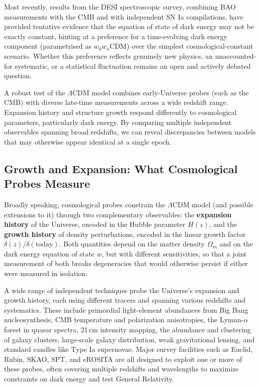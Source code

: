 Most recently, results from the DESI spectroscopic survey, combining BAO measurements with the CMB and with independent SN Ia compilations, have provided tentative evidence that the equation of state of dark energy may not be exactly constant, hinting at a preference for a time-evolving dark energy component (parametrised as $w_0 w_a\text{CDM}$) over the simplest cosmological-constant scenario. Whether this preference reflects genuinely new physics, an unaccounted-for systematic, or a statistical fluctuation remains an open and actively debated question.

\begin{tipsblock}
A robust test of the $\Lambda$CDM model combines early-Universe probes (such as the CMB) with diverse late-time measurements across a wide redshift range. Expansion history and structure growth respond differently to cosmological parameters, particularly dark energy. By comparing multiple independent observables spanning broad redshifts, we can reveal discrepancies between models that may otherwise appear identical at a single epoch.
\end{tipsblock}

\subsection{Growth and Expansion: What Cosmological Probes Measure} \label{sec:probes_overview}

Broadly speaking, cosmological probes constrain the $\Lambda$CDM model (and possible extensions to it) through two complementary observables: the \textbf{expansion history} of the Universe, encoded in the Hubble parameter $H(z)$, and the \textbf{growth history} of density perturbations, encoded in the linear growth factor $\delta(z)/\delta(\text{today})$. Both quantities depend on the matter density $\Omega_m$ and on the dark energy equation of state $w$, but with different sensitivities, so that a joint measurement of both breaks degeneracies that would otherwise persist if either were measured in isolation.

\smallskip

A wide range of independent techniques probe the Universe's expansion and growth history, each using different tracers and spanning various redshifts and systematics. These include primordial light-element abundances from Big Bang nucleosynthesis, CMB temperature and polarization anisotropies, the Lyman-$\alpha$ forest in quasar spectra, 21\,cm intensity mapping, the abundance and clustering of galaxy clusters, large-scale galaxy distribution, weak gravitational lensing, and standard candles like Type Ia supernovae. Major survey facilities such as Euclid, Rubin, SKAO, SPT, and eROSITA are all designed to exploit one or more of these probes, often covering multiple redshifts and wavelengths to maximize constraints on dark energy and test General Relativity.

